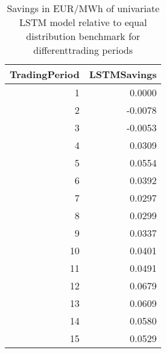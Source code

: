 \begin{table}[h!]
\centering
 \begin{adjustbox}{max width=\textwidth}
\begin{tabular}{rr}
  \hline
TradingPeriod & LSTMSavings \\ 
  \hline
    1 & 0.0000 \\ 
      2 & -0.0078 \\ 
      3 & -0.0053 \\ 
      4 & 0.0309 \\ 
      5 & 0.0554 \\ 
      6 & 0.0392 \\ 
      7 & 0.0297 \\ 
      8 & 0.0299 \\ 
      9 & 0.0337 \\ 
     10 & 0.0401 \\ 
     11 & 0.0491 \\ 
     12 & 0.0679 \\ 
     13 & 0.0609 \\ 
     14 & 0.0580 \\ 
     15 & 0.0529 \\ 
   \hline
 \end{tabular}
\end{adjustbox}
\caption{Savings in EUR/MWh of univariate LSTM model relative to equal distribution benchmark for differenttrading periods} 
\label{tab:binary.eval.cutoff}
\end{table}

